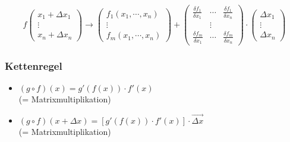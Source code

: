 \begin{displaymath}
	f
	\begin{pmatrix}
		x_1 + \Delta x_1 \\ 
		\vdots \\ 
		x_n + \Delta x_n
	\end{pmatrix}	
	\rightarrow
	\begin{pmatrix}
		f_1(x_1,\cdots , x_n) \\ 
		\vdots \\ 
		f_m(x_1,\cdots , x_n)
	\end{pmatrix}
	+
	\begin{pmatrix}
		\frac{\delta f_1}{\delta x_1} & \cdots & \frac{\delta f_1}{\delta x_n} \\ 
		& \vdots & \\ 
		\frac{\delta f_m}{\delta x_1} & \cdots & \frac{\delta f_m}{\delta x_n}
	\end{pmatrix}
	\cdot
	\begin{pmatrix}
		\Delta x_1 \\ 
		\vdots \\ 
		\Delta x_n
	\end{pmatrix}
\end{displaymath}

\subsubsection{Kettenregel}

\begin{itemize}

	\item $(g \circ f)(x) = g'(f(x)) \cdot f'(x)$ \\
	(= Matrixmultiplikation)
		
	
	\item $(g \circ f)(x + \Delta x) = [g'(f(x)) \cdot f'(x)] \cdot \vec{\Delta x}$ \\
	(= Matrixmultiplikation)

\end{itemize}
